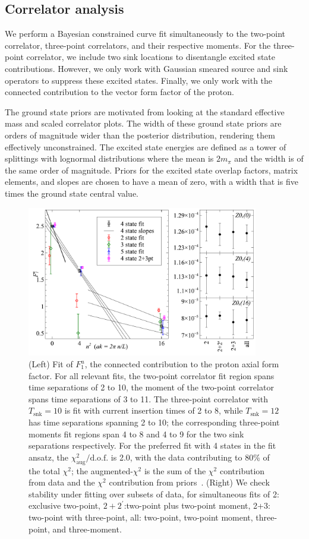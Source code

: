 \documentclass{PoS}
\begin{document}
\subsection{Correlator analysis}
We perform a Bayesian constrained curve fit simultaneously to the two-point correlator, three-point correlators, and their respective moments. For the three-point correlator, we include two sink locations to disentangle excited state contributions. However, we only work with Gaussian smeared source and sink operators to suppress these excited states. Finally, we only work with the connected contribution to the vector form factor of the proton.

The ground state priors are motivated from looking at the standard effective mass and scaled correlator plots. The width of these ground state priors are orders of magnitude wider than the posterior distribution, rendering them effectively unconstrained. The excited state energies are defined as a tower of splittings with lognormal distributions where the mean is $2m_\pi$ and the width is of the same order of magnitude. Priors for the excited state overlap factors, matrix elements, and slopes are chosen to have a mean of zero, with a width that is five times the ground state central value.

\begin{figure}[h]
	\centering
		\includegraphics[width=0.9\textwidth]{./gV.pdf}
	\caption{(Left) Fit of $F_1^u$, the connected contribution to the proton axial form factor. For all relevant fits, the two-point correlator fit region spans time separations of 2 to 10, the moment of the two-point correlator spans time separations of 3 to 11. The three-point correlator with $T_{\text{snk}}=10$ is fit with current insertion times of 2 to 8, while $T_{\text{snk}}=12$ has time separations spanning 2 to 10; the corresponding three-point moments fit regions span 4 to 8 and 4 to 9 for the two sink separations respectively. For the preferred fit with 4 states in the fit ansatz, the $\chi^2_\text{aug}/\text{d.o.f.}$ is 2.0, with the data contributing to 80\% of the total $\chi^2$; the augmented-$\chi^2$ is the sum of the $\chi^2$ contribution from data and the $\chi^2$ contribution from priors~\cite{Lepage:2001ym}. (Right) We check stability under fitting over subsets of data, for simultaneous fits of 2: exclusive two-point, $2+2^\prime$:two-point plus two-point moment, 2+3: two-point with three-point, all: two-point, two-point moment, three-point, and three-moment.}
	\label{fig:gV}
\end{figure}
\end{document}
